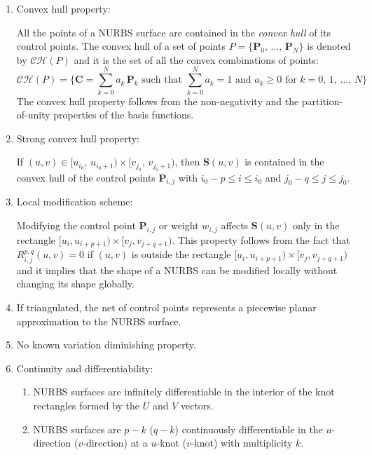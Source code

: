 \begin{enumerate}
    \item Convex hull property:
    
    All the points of a NURBS surface are contained in the \textit{convex hull} of its control points.
    The convex hull of a set of points $P = \{\mathbf{P}_{0},\, \dots,\, \mathbf{P}_{N}\}$ is denoted by $\mathcal{CH}(P)$ and it is the set of all the convex combinations of points:
    \begin{equation*}
     \mathcal{CH}(P) = \Big\{ \mathbf{C} =  \sum_{k=0}^{N} a_{k} \, \mathbf{P}_{k} \text{ such that } \sum_{k=0}^{N} a_{k} = 1 \text{ and } a_{k}\geq 0 \text{ for } k = 0,\, 1,\, \dots,\, N\Big\}
    \end{equation*}
    The convex hull property follows from the non-negativity and the partition-of-unity properties of the basis functions.
    
    \item Strong convex hull property:
    
    If $(u,v) \in [u_{i_{0}},\, u_{i_{0}+1}) \times [v_{j_{0}},\, v_{j_{0}+1})$, then $\mathbf{S}(u, v)$ is contained in the convex hull of the control points $\boldsymbol{P}_{i,j}$ with $i_{0}-p \leq i \leq i_{0}$ and $j_{0}-q \leq j \leq j_{0}$.

    \item Local modification scheme:
    
    Modifying the control point $\mathbf{P}_{i,j}$ or weight $w_{i,j}$ affects $\mathbf{S}(u, v)$ only in the rectangle $[u_{i}, u_{i+p+1}) \times [v_{j}, v_{j+q+1})$. This property follows from the fact that $ R_{i,j}^{p, q}(u, v)=0$ if $(u,v)$ is outside the rectangle $[u_{i}, u_{i+p+1}) \times [v_{j}, v_{j+q+1})$ and it implies that the shape of a NURBS can be modified locally without changing its shape globally.
    
    \item If triangulated, the net of control points represents a piecewise planar approximation to the NURBS surface.

    \item No known variation diminishing property.
    
    \item Continuity and differentiability:
    \begin{enumerate}
        \item NURBS surfaces are infinitely differentiable in the interior of the knot rectangles formed by the $U$ and $V$ vectors.
        \item NURBS surfaces are $p-k$ ($q-k$) continuously differentiable in the $u$-direction ($v$-direction) at a $u$-knot ($v$-knot) with multiplicity $k$.
    \end{enumerate}
    

\end{enumerate}

